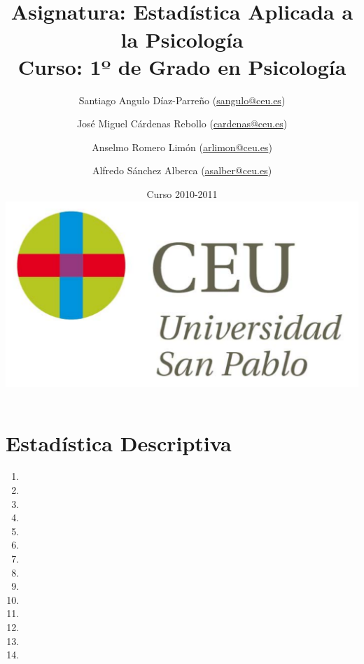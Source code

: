 \documentclass[a4paper,titlepage]{article}
\begin{document}
\sloppy

\title{\vskip 2cm
\shadowbox{\Huge \textbf{\textsf{\quad \textcolor[rgb]{0.00,0.00,0.50}{EJERCICIOS DE ESTADÍSTICA}\quad}}}\\
   \vskip 1cm
   {\Large \textsf{\textcolor[rgb]{0.50,0.00,0.25}{Asignatura: Estadística Aplicada a la Psicología }}}\\
   {\Large \textsf{\textcolor[rgb]{0.50,0.00,0.25}{Curso: 1º de Grado en Psicología}}}
   }
\author{
   Santiago Angulo Díaz-Parreño (\url{sangulo@ceu.es})
   \and
   José Miguel Cárdenas Rebollo (\url{cardenas@ceu.es})
   \and
   Anselmo Romero Limón (\url{arlimon@ceu.es})
   \and
   Alfredo Sánchez Alberca (\url{asalber@ceu.es})
}
\date{Curso 2010-2011\\[1cm]
\includegraphics[scale=0.3]{img/logo_uspceu_01}}

\maketitle
\newpage
\tableofcontents
\newpage









\section{Estadística Descriptiva}
\begin{enumerate}[leftmargin=*]
\item {}
\item {}
\item {}
\item {}
\item {}
\item {}
\item {}
\item {}
\item {}
\item {}
\item {}
\item {}
\item {}
\item {}
\end{enumerate}
\end{document}
